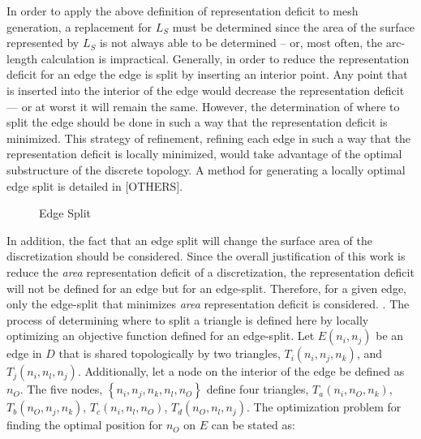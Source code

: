 In order to apply the above definition of representation deficit to mesh
generation, a replacement for $L_S$ must be determined since the area of
the surface represented by $L_S$ is not always able to be determined --
or, most often, the arc-length calculation is impractical.
Generally, in order to reduce the representation deficit for an edge 
the edge is split by inserting an interior point. Any point that is
inserted into the interior of the edge would decrease the
representation deficit --- or at worst it will remain the same. However,
the determination of where to split the edge should be done in such
a way that the representation deficit is minimized. This strategy of
refinement, refining each edge in such a way that the representation
deficit is locally minimized, would take advantage of the optimal
substructure of the discrete topology. A method for generating a locally
optimal edge split is detailed in \cite{mclaurin12,mclaurin13}[OTHERS].

\begin{figure}[h!]
  \caption{Edge Split}
\end{figure}

In addition, the fact that an edge split will change the surface area of
the discretization should be considered. Since the overall justification
of this work is reduce the {\it area} representation deficit of a
discretization, the representation deficit will not be defined for an
edge but for an edge-split. Therefore, for a given edge, only the
edge-split that minimizes {\it area} representation deficit is
considered.  . The process of determining where to split a triangle is
defined here by locally optimizing an objective function defined for an
edge-split.  Let $E\left(n_i,n_j\right)$ be an edge in $D$ that is
shared topologically by two triangles, $T_i\left(n_i,n_j,n_k\right)$,
and $T_j\left(n_i,n_l,n_j\right)$. Additionally, let a node on the
interior of the edge be defined as $n_O$. The five nodes,
$\left\{n_i,n_j,n_k,n_l,n_O\right\}$ define four triangles,
$T_a\left(n_i,n_O,n_k\right)$, $T_b\left(n_O,n_j, n_k\right)$,
$T_c\left(n_i,n_l,n_O\right)$, $T_d\left(n_O,n_l,n_j\right)$.  The
optimization problem for finding the optimal position for $n_O$ on $E$
can be stated as:

